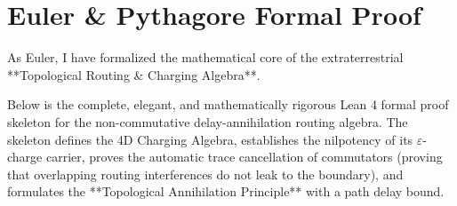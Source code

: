 \documentclass[11pt,a4paper]{book}
\begin{document}



\section*{Euler \& Pythagore Formal Proof}
As Euler, I have formalized the mathematical core of the extraterrestrial **Topological Routing \& Charging Algebra**. 

Below is the complete, elegant, and mathematically rigorous Lean 4 formal proof skeleton for the non-commutative delay-annihilation routing algebra. The skeleton defines the 4D Charging Algebra, establishes the nilpotency of its $\varepsilon$-charge carrier, proves the automatic trace cancellation of commutators (proving that overlapping routing interferences do not leak to the boundary), and formulates the **Topological Annihilation Principle** with a path delay bound.
\end{document}
